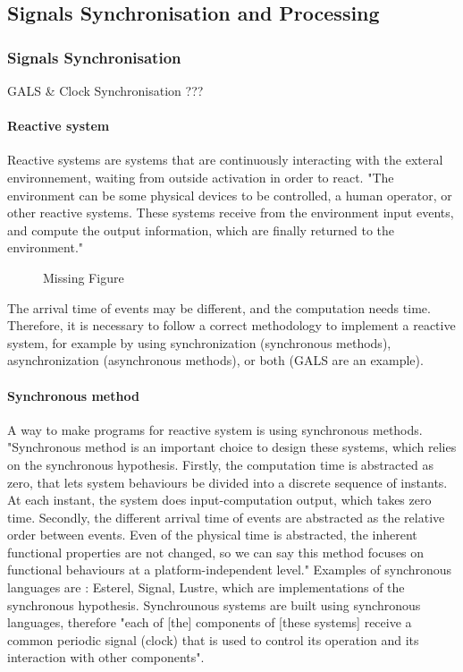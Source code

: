 \subsection{Signals Synchronisation and Processing}






\subsubsection{Signals Synchronisation}

GALS \& Clock Synchronisation ??? 

\paragraph{Reactive system} Reactive systems are systems that are continuously interacting with the exteral environnement, waiting from outside activation in order to react. "The environment can be some physical devices to be controlled, a human operator, or other reactive systems. These systems receive from the environment input events, and compute the output information, which are finally returned to the environment."\cite{SignalPaper}

\begin{figure}[H]
\centering
\caption{Missing Figure}
\end{figure}

The arrival time of events may be different, and the computation needs time. Therefore, it is necessary to follow a correct methodology to implement a reactive system, for example by using synchronization  (synchronous methods), asynchronization (asynchronous methods), or both (GALS are an example).

\paragraph{Synchronous method} A way to make programs for reactive system is using synchronous methods. "Synchronous method is an important choice to design these systems, which relies on the synchronous hypothesis. Firstly, the computation time is abstracted as zero, that lets system behaviours be divided into a discrete sequence of instants. At each instant, the system does input-computation output, which takes zero time. Secondly, the different arrival time of events are abstracted as the relative order between events. Even of the physical time is abstracted, the inherent functional properties are not changed, so we can say this method focuses on functional behaviours at a platform-independent level."\cite{SignalPaper} Examples of synchronous languages are : Esterel, Signal, Lustre, which are implementations of the synchronous hypothesis. Synchrounous systems are built using synchronous languages, therefore "each of [the] components of [these systems] receive a common periodic signal (clock) that is used to control its operation and its interaction with other components"\cite{GalsArticle}.

